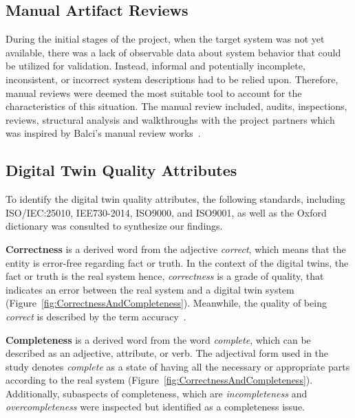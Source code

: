 \documentclass{llncs}
\begin{document}
    \subsection{Manual Artifact Reviews}
    During the initial stages of the project, when the target system was not yet available,
    there was a lack of observable data about system behavior that could be utilized for validation. 
    Instead, informal and potentially incomplete, inconsistent, or incorrect system descriptions had to be relied upon. 
    Therefore, manual reviews were deemed the most suitable tool to account for the characteristics of this situation.
    The manual review included, audits, inspections, reviews, structural analysis and walkthroughs 
    with the project partners which was inspired by Balci's manual review works~\cite{balcitechniques}. 
    
    \subsection{Digital Twin Quality Attributes}\label{section:Digital Twin Quality Attributes}
    To identify the digital twin quality attributes, the following standards, including ISO/IEC:25010, IEE730-2014, ISO9000, and ISO9001, 
    as well as the Oxford dictionary was consulted to 
    synthesize our findings\cite{ISO9000,ISO90012015,ISO/IEC:25010,IEE730-2014, OxfordDictionary}.
    
    
    \textbf{Correctness} is a  derived word from the adjective \textit{correct}, which means that the entity is error-free regarding fact or truth. 
    In the context of the digital twins, the fact or truth is the real system hence, \textit{correctness} is a grade of quality, 
    that indicates an error between the real system and a digital twin system (Figure~\ref{fig:CorrectnessAndCompleteness}).
    Meanwhile, the quality of being \textit{correct} is described by the term accuracy~\cite{OxfordDictionary}. 
    
    \textbf{Completeness} is a derived word from the word  \textit{complete}, which can be described as an adjective, attribute, or verb\cite{OxfordDictionary}. 
    The adjectival form used in the study denotes \textit{complete} as a state of having all the necessary or appropriate parts according to the real system 
    (Figure~\ref{fig:CorrectnessAndCompleteness}). Additionally, subaspects of completeness, which are \textit{incompleteness} and \textit{overcompleteness} 
    were inspected but identified as a completeness issue.  
    
\end{document}
